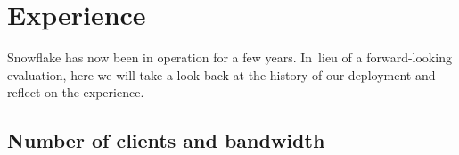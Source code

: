 \documentclass[letterpaper,twocolumn]{article}
\begin{document}
\begin{figure}[t]
{%
}
\label{fig:user-counts}
\end{figure}

\section{Experience}
\label{sec:experience}

Snowflake has now been in operation for a few years.
In~lieu of a forward-looking evaluation,
here we will take a look back
at the history of our deployment
and reflect on the experience.

\subsection{Number of clients and bandwidth}
\label{sec:deployment}
\end{document}
